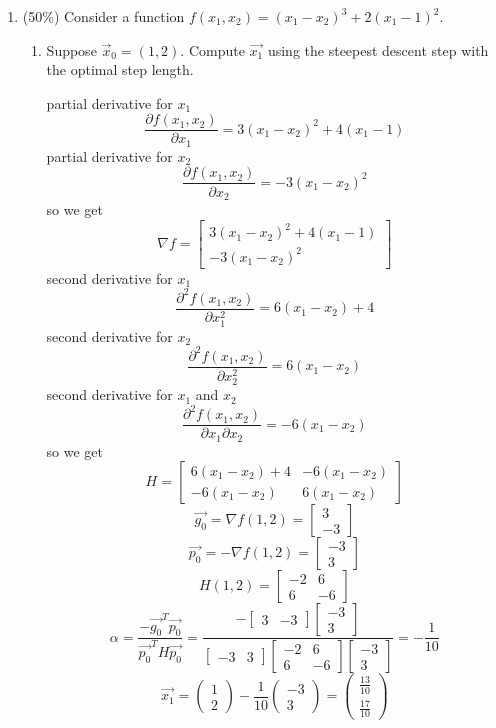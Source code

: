 \documentclass[a4paper,10pt]{article}
\begin{document}
\begin{enumerate}
{}

  \item (50\%) Consider a function $f(x_1,x_2) = (x_1-x_2)^3+2(x_1-1)^2$. 
   	\begin{enumerate}
    \item Suppose $\vec{x}_0=(1,2)$. Compute $\vec{x_1}$ using the steepest descent step with the optimal step length.

{\color{blue}
partial derivative for $x_1$ 
$$\frac{\partial f(x_1,x_2)}{\partial x_1}=3(x_1-x_2)^2 +4(x_1 -1)$$
partial derivative for $x_2$
$$\frac{\partial f(x_1,x_2)}{\partial x_2}=-3(x_1-x_2)^2$$
so we get  $$\nabla f = \begin{bmatrix}
3(x_1-x_2)^2 +4(x_1 -1) \\-3(x_1-x_2)^2
\end{bmatrix}$$
second derivative for $x_1$ 
$$\frac{\partial^2 f(x_1,x_2)}{\partial x_1^2}=6(x_1-x_2)+4$$
second derivative for $x_2$
$$\frac{\partial^2 f(x_1,x_2)}{\partial x_2^2}=6(x_1-x_2)$$
second derivative for $x_1$ and $x_2$ 
$$\frac{\partial^2 f(x_1,x_2)}{\partial x_1 \partial x_2}=-6(x_1-x_2)$$
so we get $$H = \begin{bmatrix}
6(x_1-x_2)+4&-6(x_1-x_2)\\-6(x_1-x_2)&6(x_1-x_2)
\end{bmatrix}$$
$$\vec{g_0}=\nabla f(1,2)=\begin{bmatrix}
3\\-3
\end{bmatrix}$$
$$\vec{p_0}=-\nabla f(1,2)=\begin{bmatrix}
-3\\3
\end{bmatrix}$$
$$H(1,2)=\begin{bmatrix}
-2&6\\6&-6
\end{bmatrix}$$
$$\alpha=\frac{-\vec{g_0}^T \vec{p_0}}{\vec{p_0}^T H \vec{p_0}}=\frac{-\begin{bmatrix}
3&-3
\end{bmatrix}\begin{bmatrix}
-3\\3
\end{bmatrix}}{\begin{bmatrix}
-3&3
\end{bmatrix}\begin{bmatrix}
-2&6\\6&-6
\end{bmatrix}\begin{bmatrix}
-3\\3
\end{bmatrix}}=-\frac{1}{10}$$
$$\vec{x_1}=\begin{pmatrix}
1\\2
\end{pmatrix}-\frac{1}{10}\begin{pmatrix}
-3\\3
\end{pmatrix}=\begin{pmatrix}
\frac{13}{10}\\\frac{17}{10}
\end{pmatrix}$$
}


\end{enumerate}
\end{enumerate}
\end{document}
